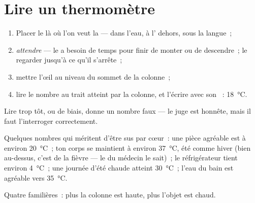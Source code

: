\section{Lire un thermomètre}

\begin{method}\label{met:g3:temperature-thermometers:read}
\begin{enumerate}
  \item Placer le  là où l'on veut la  --- dans
        l'eau, à l' dehors, sous la langue~;
  \item \emph{attendre} --- le  a besoin de temps pour finir
        de monter ou de descendre~; le regarder jusqu'à ce qu'il
        s'arrête~;
  \item mettre l'œil au niveau du sommet de la colonne~;
  \item lire le nombre au trait atteint par la colonne, et l'écrire
        avec son ~: \qty{18}{\celsius}.
\end{enumerate}
Lire trop tôt, ou de biais, donne un nombre faux --- le juge est
honnête, mais il faut l'interroger correctement.
\end{method}

\begin{example}\label{ex:g3:temperature-thermometers:livedby}
Quelques nombres qui méritent d'être sus par cœur~: une pièce
agréable est à environ \qty{20}{\celsius}~; ton corps se maintient à
environ \qty{37}{\celsius}, été comme hiver (bien au-dessus, c'est de
la fièvre --- le  du médecin le sait)~; le réfrigérateur
tient environ \qty{4}{\celsius}~; une journée d'été chaude atteint
\qty{30}{\celsius}~; l'eau du bain est agréable vers
\qty{35}{\celsius}.
\end{example}

\begin{omfigure}

{\small Quatre  familières~: plus la colonne est haute,
plus l'objet est chaud.}
\end{omfigure}

